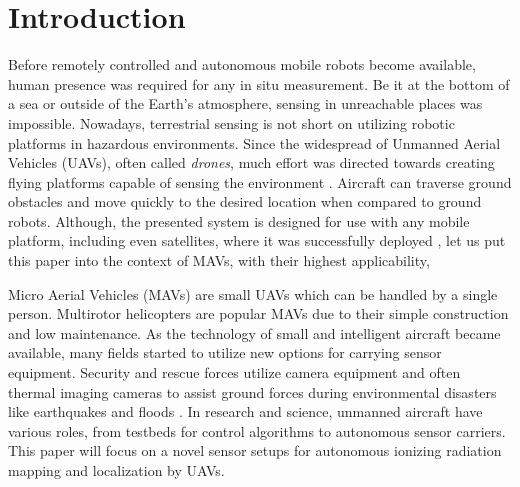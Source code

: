 \documentclass[a4paper,11pt,titlepage,twoside]{book}
\begin{document}


\pagestyle{fancy}

\tableofcontents


\cleardoublepage


\chapter{Introduction}


Before remotely controlled and autonomous mobile robots become available, human presence was required for any in situ measurement.
Be it at the bottom of a sea or outside of the Earth's atmosphere, sensing in unreachable places was impossible.
Nowadays, terrestrial sensing is not short on utilizing robotic platforms in hazardous environments.
Since the widespread of Unmanned Aerial Vehicles (UAVs), often called \textit{drones}, much effort was directed towards creating flying platforms capable of sensing the environment \cite{pajares2015overview}.
Aircraft can traverse ground obstacles and move quickly to the desired location when compared to ground robots.
Although, the presented system is designed for use with any mobile platform, including even satellites, where it was successfully deployed \cite{baca2018vzlusat, baca2018rospix}, let us put this paper into the context of MAVs, with their highest applicability,

Micro Aerial Vehicles (MAVs) are small UAVs which can be handled by a single person.
Multirotor helicopters are popular MAVs due to their simple construction and low maintenance.
As the technology of small and intelligent aircraft became available, many fields started to utilize new options for carrying sensor equipment.
Security and rescue forces utilize camera equipment and often thermal imaging cameras to assist ground forces during environmental disasters like earthquakes and floods \cite{yuan2015survey, perks2016advances}.
In research and science, unmanned aircraft have various roles, from testbeds for control algorithms to autonomous sensor carriers.
This paper will focus on a novel sensor setups for autonomous ionizing radiation mapping and localization by UAVs.
\end{document}
